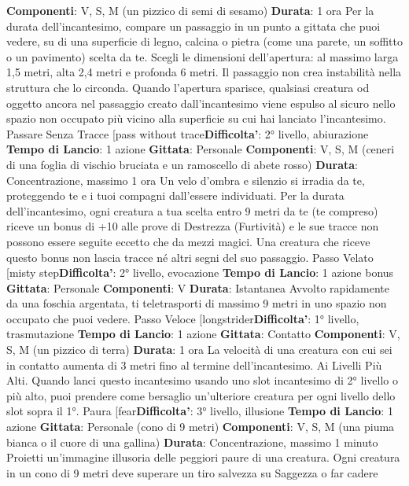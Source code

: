 \begin{multicols}{2}
\textbf{Componenti}: V, S, M (un pizzico di semi di sesamo)
\textbf{Durata}: 1 ora
Per la durata dell’incantesimo, compare un passaggio
in un punto a gittata che puoi vedere, su di una
superficie di legno, calcina o pietra (come una parete,
un soffitto o un pavimento) scelta da te. Scegli le
dimensioni dell’apertura: al massimo larga 1,5 metri, 
alta 2,4 metri e profonda 6 metri. Il passaggio non crea
instabilità nella struttura che lo circonda.
Quando l’apertura sparisce, qualsiasi creatura od
oggetto ancora nel passaggio creato dall’incantesimo
viene espulso al sicuro nello spazio non occupato più
vicino alla superficie su cui hai lanciato l’incantesimo.
Passare Senza Tracce
[pass without trace\textbf{Difficolta'}:
2° livello, abiurazione
\textbf{Tempo di Lancio}: 1 azione
\textbf{Gittata}: Personale
\textbf{Componenti}: V, S, M (ceneri di una foglia di vischio
bruciata e un ramoscello di abete rosso)
\textbf{Durata}: Concentrazione, massimo 1 ora
Un velo d’ombra e silenzio si irradia da te, proteggendo
te e i tuoi compagni dall’essere individuati. Per la durata
dell’incantesimo, ogni creatura a tua scelta entro 9 metri
da te (te compreso) riceve un bonus di +10 alle prove di
Destrezza (Furtività) e le sue tracce non possono
essere seguite eccetto che da mezzi magici. Una
creatura che riceve questo bonus non lascia tracce né
altri segni del suo passaggio.
Passo Velato
[misty step\textbf{Difficolta'}:
2° livello, evocazione
\textbf{Tempo di Lancio}: 1 azione bonus
\textbf{Gittata}: Personale
\textbf{Componenti}: V
\textbf{Durata}: Istantanea
Avvolto rapidamente da una foschia argentata, ti
teletrasporti di massimo 9 metri in uno spazio non
occupato che puoi vedere.
Passo Veloce
[longstrider\textbf{Difficolta'}:
1° livello, trasmutazione
\textbf{Tempo di Lancio}: 1 azione
\textbf{Gittata}: Contatto
\textbf{Componenti}: V, S, M (un pizzico di terra)
\textbf{Durata}: 1 ora
La velocità di una creatura con cui sei in contatto
aumenta di 3 metri fino al termine dell’incantesimo.
Ai Livelli Più Alti. Quando lanci questo incantesimo
usando uno slot incantesimo di 2° livello o più alto, puoi
prendere come bersaglio un’ulteriore creatura per ogni
livello dello slot sopra il 1°.
Paura
[fear\textbf{Difficolta'}:
3° livello, illusione
\textbf{Tempo di Lancio}: 1 azione
\textbf{Gittata}: Personale (cono di 9 metri)
\textbf{Componenti}: V, S, M (una piuma bianca o il cuore di
una gallina)
\textbf{Durata}: Concentrazione, massimo 1 minuto
Proietti un’immagine illusoria delle peggiori paure di una
creatura. Ogni creatura in un cono di 9 metri deve
superare un tiro salvezza su Saggezza o far cadere

\end{multicols}
